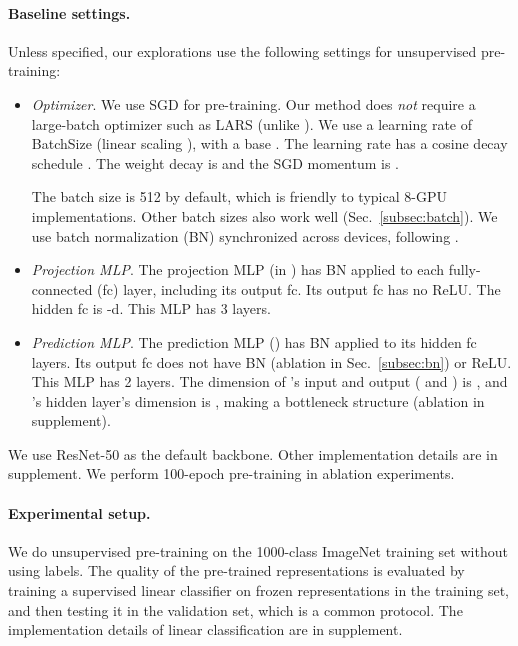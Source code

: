 \documentclass[final]{cvpr}
\newcommand{\appdx}{supplement}
\begin{document}
\paragraph{Baseline settings.} Unless specified, our explorations use the following settings for unsupervised pre-training:
\begin{itemize}[leftmargin=*]

\item \emph{Optimizer}. We use SGD for pre-training. Our method does \emph{not} require a large-batch optimizer such as LARS \cite{You2017} (unlike \cite{Chen2020,Grill2020,Caron2020}).
We use a learning rate of BatchSize (linear scaling \cite{Goyal2017}), with a base . The learning rate has a cosine decay schedule \cite{Loshchilov2016,Chen2020}. The weight decay is  and the SGD momentum is .

The batch size is 512 by default, which is friendly to typical 8-GPU implementations. Other batch sizes also work well (Sec.~\ref{subsec:batch}). We use batch normalization (BN) \cite{Ioffe2015} synchronized across devices, following \cite{Chen2020,Grill2020,Caron2020}.

\item \emph{Projection MLP}. The projection MLP (in ) has BN applied to each fully-connected (fc) layer, including its output fc. Its output fc has no ReLU. The hidden fc is -d. This MLP has 3 layers.

\item \emph{Prediction MLP}. The prediction MLP () has BN applied to its hidden fc layers. Its output fc does not have BN (ablation in Sec.~\ref{subsec:bn}) or ReLU. This MLP has 2 layers.
The dimension of 's input and output ( and ) is , and 's hidden layer's dimension is , making  a bottleneck structure (ablation in \appdx). 

\end{itemize}

\noindent We use ResNet-50 \cite{He2016} as the default backbone. Other implementation details are in \appdx. We perform 100-epoch pre-training in ablation experiments. 

\paragraph{Experimental setup.}
We do unsupervised pre-training on the 1000-class ImageNet training set \cite{Deng2009} without using labels. The quality of the pre-trained representations is evaluated by training a supervised linear classifier on frozen representations in the training set, and then testing it in the validation set, which is a common protocol. The implementation details of linear classification are in \appdx.
\end{document}
